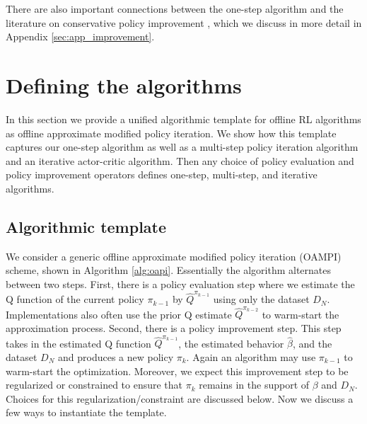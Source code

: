 There are also important connections between the one-step algorithm and the literature on conservative policy improvement \citep{kakade2002approximately, schulman2015trust, achiam2017constrained}, which we discuss in more detail in Appendix \ref{sec:app_improvement}.


\section{Defining the algorithms}

In this section we provide a unified algorithmic template for offline RL algorithms as offline approximate modified policy iteration. We show how this template captures our one-step algorithm as well as a multi-step policy iteration algorithm and an iterative actor-critic algorithm.
Then any choice of policy evaluation and policy improvement operators defines one-step, multi-step, and iterative algorithms.


\subsection{Algorithmic template}

We consider a generic offline approximate modified policy iteration (OAMPI) scheme, shown in Algorithm \ref{alg:oapi}. Essentially the algorithm alternates between two steps. First, there is a policy evaluation step where we estimate the Q function of the current policy $ \pi_{k-1}$ by $ \widehat Q^{\pi_{k-1}}$ using only the dataset $ D_N$. Implementations also often use the prior Q estimate $ \widehat Q^{\pi_{k-2}}$ to warm-start the approximation process. Second, there is a policy improvement step. This step takes in the estimated Q function $ \widehat Q^{\pi_{k-1}}$, the estimated behavior $ \hat \beta$, and the dataset $ D_N$ and produces a new policy $ \pi_k$. Again an algorithm may use $ \pi_{k-1}$ to warm-start the optimization. Moreover, we expect this improvement step to be regularized or constrained to ensure that $ \pi_k$ remains in the support of $ \beta$ and $ D_N$. Choices for this regularization/constraint are discussed below. Now we discuss a few ways to instantiate the template.

